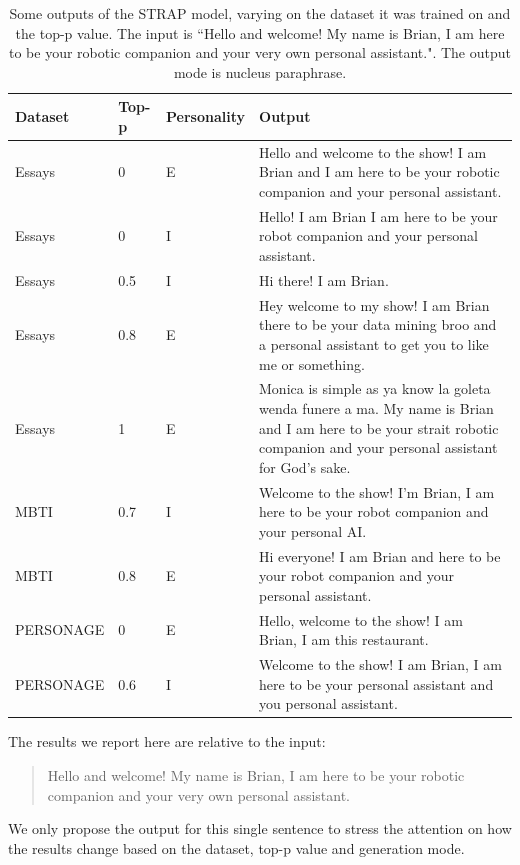 \documentclass[nomenclature, english, biblatex]{kththesis}
\begin{document}
\begin{table}
    \centering
    \begin{adjustbox}{max width=\textwidth}
        \begin{tabular}{|p{}|p{}|p{}|p{}|}
        \hline
        Dataset & Top-p & Personality & Output \\
        \hline
        \hline
        Essays & 0 & E & Hello and welcome to the show! I am Brian and I am here to be your robotic companion and your personal assistant.\\
        \hline
        Essays & 0 & I & Hello! I am Brian I am here to be your robot companion and your personal assistant.\\
        \hline
        Essays & 0.5 & I & Hi there! I am Brian. \\
        \hline
        Essays & 0.8 & E & Hey welcome to my show! I am Brian there to be your data mining broo and a personal assistant to get you to like me or something.\\
        \hline
        Essays & 1 & E & Monica is simple as ya know la goleta wenda funere a ma. My name is Brian and I am here to be your strait robotic companion and your personal assistant for God's sake.\\
        \hline
        MBTI & 0.7 & I & Welcome to the show! I'm Brian, I am here to be your robot companion and your personal AI.\\
        \hline
        MBTI & 0.8 & E & Hi everyone! I am Brian and here to be your robot companion and your personal assistant.\\
        \hline
        PERSONAGE & 0 & E & Hello, welcome to the show! I am Brian, I am this restaurant.\\
        \hline
        PERSONAGE & 0.6 & I & Welcome to the show! I am Brian, I am here to be your personal assistant and you personal assistant.\\
        \hline
        \end{tabular}
    \end{adjustbox}
    \caption{Some outputs of the STRAP model, varying on the dataset it was trained on and the top-p value. The input is ``Hello and welcome! My name is Brian, I am here to be your robotic companion and your very own personal assistant.". The output mode is nucleus paraphrase.}
    \label{tab:strap_np_results}
\end{table}
The results we report here are relative to the input:
\begin{quote}
Hello and welcome! My name is Brian, I am here to be your robotic companion and your very own personal assistant.    
\end{quote}
We only propose the output for this single sentence to stress the attention on how the results change based on the dataset, top-p value and generation mode.
\end{document}
